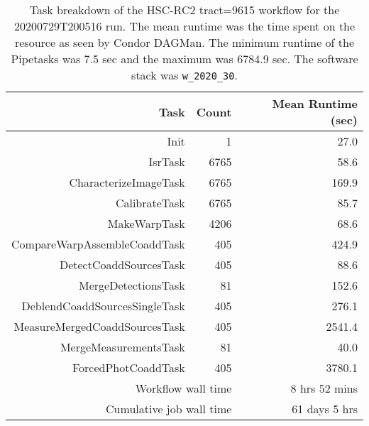 \begin{table}
\centering
\begin{tabular} {|r|r|r|}
\hline
{Task}&{Count}    &{Mean Runtime (sec)} \\ \hline
Init & 1 & 27.0 \\
IsrTask & 6765 & 58.6 \\
CharacterizeImageTask & 6765 & 169.9 \\
CalibrateTask & 6765 & 85.7 \\
MakeWarpTask & 4206 & 68.6 \\
CompareWarpAssembleCoaddTask & 405 & 424.9 \\
DetectCoaddSourcesTask & 405 & 88.6 \\
MergeDetectionsTask & 81 & 152.6 \\
DeblendCoaddSourcesSingleTask & 405 & 276.1 \\
MeasureMergedCoaddSourcesTask & 405 & 2541.4 \\
MergeMeasurementsTask & 81 & 40.0 \\
ForcedPhotCoaddTask & 405 & 3780.1 \\
\hline
\multicolumn{2}{|r|}{Workflow wall time} & 8 hrs 52 mins \\
\hline
\multicolumn{2}{|r|}{Cumulative job wall time} & 61 days 5 hrs \\
\hline
\end{tabular}
\caption{Task breakdown of the HSC-RC2 tract=9615 workflow for the 20200729T200516 run.
The mean runtime was the time spent on the resource as seen by Condor DAGMan.
The minimum runtime of the Pipetasks was 7.5 sec and the maximum was 6784.9 sec.
The software stack was \texttt{w\_2020\_30}.
}
\label{tab:taskBreakdownW30}
\end{table}
